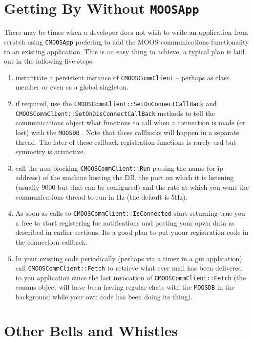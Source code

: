 \documentclass[a4paper,10pt]{article}
\newcommand{\Code}[1]{\texttt{#1} }
\newcommand{\code}[1]{\Code{#1} }
\begin{document}
\section{Getting By Without \code{MOOSApp}}


There may be times when a developer does not wish to write an application from scratch using \code{CMOOSApp} prefering to add the MOOS communications functionality to an existing application. This is an easy thing to achieve, a typical plan is laid out in the following five steps:

\begin{enumerate}
\item instantiate a persistent instance of \code{CMOOSCommClient} -- perhaps as class member or even as a global singleton.
\item if required, use the \code{CMOOSCommClient::SetOnConnectCallBack} and \code{CMOOSCommClient::SetOnDisConnectCallBack} methods to tell the communications object what functions to call when a connection is made (or lost) with the \code{MOOSDB}. Note that these callbacks will happen in a separate thread. The later of these callback registration functions is rarely usd but symmetry is attractive.
\item call the non-blocking \code{CMOOSCommClient::Run} passing the name (or ip address) of the machine hosting the DB, the port on which it is listening (usually 9000 but that can be configured) and the rate at which you want the communications thread to run in Hz (the default is 5Hz).
\item As soon as calls to \code{CMOOSCommClient::IsConnected} start returning true you a free to start registering for notifications and posting your opwn data as described in earlier sections. Its a good plan to put yuour registration code in the connection callback.
\item In your existing code periodically (perhaps via a timer in a gui application) call \code{CMOOSCommClient::Fetch} to retrieve what ever mail has been delivered to you application since the last invocation of \code{CMOOSCommClient::Fetch} (the comms object will have been having regular chats with the \code{MOOSDB} in the background while your own code has been doing its thing).
\end{enumerate}






\section{Other Bells and Whistles}
\end{document}
